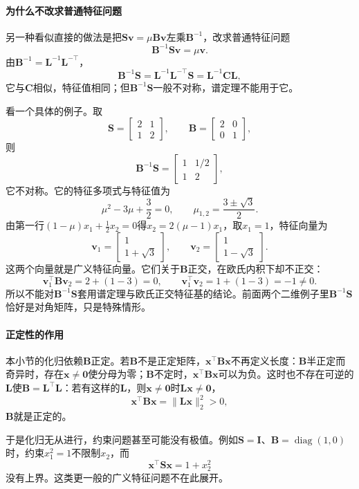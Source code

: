 \paragraph{为什么不改求普通特征问题}
另一种看似直接的做法是把$\bm S\bm v=\mu\bm B\bm v$左乘$\bm B^{-1}$，改求普通特征问题
\[
 \bm B^{-1}\bm S\bm v=\mu\bm v .
\]
由$\bm B^{-1}=\bm L^{-1}\bm L^{-\top}$，
\[
 \bm B^{-1}\bm S=\bm L^{-1}\bm L^{-\top}\bm S=\bm L^{-1}\bm C\bm L ,
\]
它与$\bm C$相似，特征值相同；但$\bm B^{-1}\bm S$一般不对称，谱定理不能用于它。

看一个具体的例子。取
\[
 \bm S=\begin{bmatrix}2&1\\1&2\end{bmatrix},\qquad
 \bm B=\begin{bmatrix}2&0\\0&1\end{bmatrix},
\]
则
\[
 \bm B^{-1}\bm S=\begin{bmatrix}1&1/2\\1&2\end{bmatrix},
\]
它不对称。它的特征多项式与特征值为
\[
 \mu^2-3\mu+\frac32=0,\qquad \mu_{1,2}=\frac{3\pm\sqrt3}{2}.
\]
由第一行$(1-\mu)x_1+\tfrac12x_2=0$得$x_2=2(\mu-1)x_1$，取$x_1=1$，特征向量为
\[
 \bm v_1=\begin{bmatrix}1\\1+\sqrt3\end{bmatrix},\qquad
 \bm v_2=\begin{bmatrix}1\\1-\sqrt3\end{bmatrix}.
\]
这两个向量就是广义特征向量。它们关于$\bm B$正交，在欧氏内积下却不正交：
\[
 \bm v_1^\top\bm B\bm v_2=2+(1-3)=0,\qquad
 \bm v_1^\top\bm v_2=1+(1-3)=-1\neq0 .
\]
所以不能对$\bm B^{-1}\bm S$套用谱定理与欧氏正交特征基的结论。前面两个二维例子里$\bm B^{-1}\bm S$恰好是对角矩阵，只是特殊情形。

\paragraph{正定性的作用}
本小节的化归依赖$\bm B$正定。若$\bm B$不是正定矩阵，$\bm x^\top\bm B\bm x$不再定义长度：$\bm B$半正定而奇异时，存在$\bm x\neq\bm0$使分母为零；$\bm B$不定时，$\bm x^\top\bm B\bm x$可以为负。这时也不存在可逆的$\bm L$使$\bm B=\bm L^\top\bm L$：若有这样的$\bm L$，则$\bm x\neq\bm0$时$\bm L\bm x\neq\bm0$，
\[
 \bm x^\top\bm B\bm x=\lVert\bm L\bm x\rVert_2^2>0 ,
\]
$\bm B$就是正定的。

于是化归无从进行，约束问题甚至可能没有极值。例如$\bm S=\bm I$、$\bm B=\operatorname{diag}(1,0)$时，约束$x_1^2=1$不限制$x_2$，而
\[
 \bm x^\top\bm S\bm x=1+x_2^2
\]
没有上界。这类更一般的广义特征问题不在此展开。

